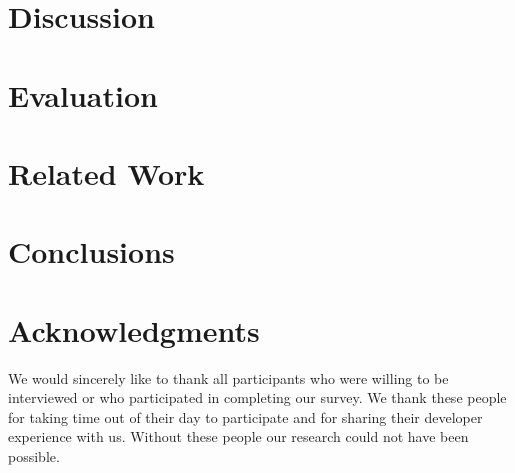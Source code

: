 \documentclass[conference]{IEEEtran}
\begin{document}
\section{Discussion}
\label{sec:disc}

\section{Evaluation}
\label{sec:eval}

\section{Related Work}
\label{sec:related}

\section{Conclusions}
\label{sec:conc}

\section{Acknowledgments}

We would sincerely like to thank all participants who were willing to be interviewed or who participated
in completing our survey. We thank these people for taking time out of their day to participate and for
sharing their developer experience with us. Without these people our research could not have been possible.


\balance


\end{document}
